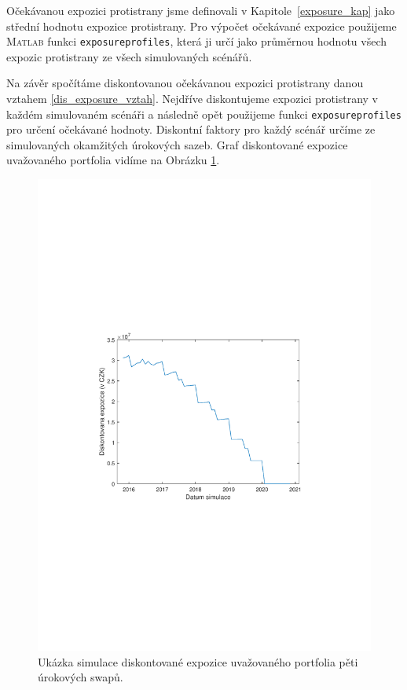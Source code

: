 \documentclass[a4paper,12pt]{report}
\theoremstyle{definition} \newtheorem{definice}[veta]{Definice}
\theoremstyle{remark}
\newcommand{\MATLAB}{\textsc{Matlab}\xspace}
\begin{document}
Očekávanou expozici protistrany jsme definovali v Kapitole~\ref{exposure_kap} jako střední hodnotu expozice protistrany.
Pro výpočet očekávané expozice použijeme \MATLAB funkci \verb+exposureprofiles+, která ji určí jako průměrnou hodnotu všech expozic protistrany ze všech simulovaných scénářů.

Na závěr spočítáme diskontovanou očekávanou expozici protistrany danou vztahem \eqref{dis_exposure_vztah}.
Nejdříve diskontujeme expozici protistrany v každém simulovaném scénáři a následně opět použijeme funkci \verb+exposureprofiles+ pro určení očekávané hodnoty.
Diskontní faktory pro každý scénář určíme ze simulovaných okamžitých úrokových sazeb. 
Graf diskontované expozice uvažovaného portfolia vidíme na Obrázku \ref{DiscountExposure}.
\begin{figure}[!htbp]
  \centering 
	\includegraphics[width=13cm, clip, trim= 110 270 110 270]{IMG/Diskontovana_expozice.pdf}
  \caption{Ukázka simulace diskontované expozice uvažovaného portfolia pěti úrokových swapů.}  \label{DiscountExposure}
\end{figure}
\end{document}
